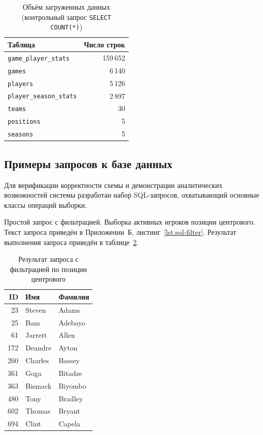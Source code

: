 {\footnotesize\setlength{\tabcolsep}{4pt}\renewcommand{\arraystretch}{1.15}
\begin{table}[H]
\caption{Объём загруженных данных (контрольный запрос \texttt{SELECT COUNT(*)})}
\label{tab:db-count}
\centering
\begin{tabular}{|l|r|}
\hline
\textbf{Таблица} & \textbf{Число строк} \\
\hline
\texttt{game\_player\_stats}  & 159\,652 \\
\texttt{games}                 & 6\,140 \\
\texttt{players}               & 5\,126 \\
\texttt{player\_season\_stats} & 2\,897 \\
\texttt{teams}                 & 30 \\
\texttt{positions}             & 5 \\
\texttt{seasons}               & 5 \\
\hline
\end{tabular}
\end{table}}

\subsection{Примеры запросов к базе данных}

Для верификации корректности схемы и демонстрации аналитических
возможностей системы разработан набор SQL-запросов, охватывающий основные
классы операций выборки.

Простой запрос с фильтрацией. Выборка активных игроков позиции
центрового. Текст запроса приведён в Приложении~Б,
листинг~\ref{lst:sql-filter}.
Результат выполнения запроса приведён в таблице~\ref{tab:sql-filter-result}.

{\footnotesize\setlength{\tabcolsep}{4pt}\renewcommand{\arraystretch}{1.15}
\begin{table}[H]
\caption{Результат запроса с фильтрацией по позиции центрового}
\label{tab:sql-filter-result}
\centering
\begin{tabular}{|r|l|l|}
\hline
\textbf{ID} & \textbf{Имя} & \textbf{Фамилия} \\
\hline
23  & Steven  & Adams   \\
25  & Bam     & Adebayo \\
61  & Jarrett & Allen   \\
172 & Deandre & Ayton   \\
260 & Charles & Bassey  \\
361 & Goga    & Bitadze \\
363 & Bismack & Biyombo \\
480 & Tony    & Bradley \\
602 & Thomas  & Bryant  \\
694 & Clint   & Capela  \\
\hline
\end{tabular}
\end{table}}

